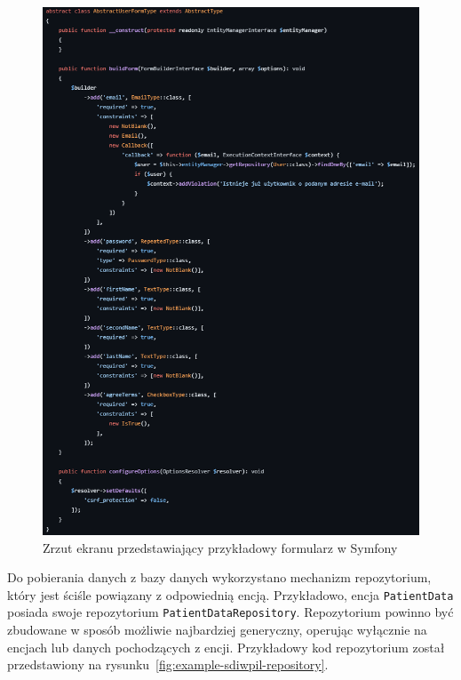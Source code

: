 \documentclass[12pt,oneside]{book}
\newcommand{\captionvspace}{\vspace{6pt}}
\begin{document}
    \begin{figure}[ht]
        \centering
        \includegraphics[width=\textwidth]{includes/images/example-form-before-migration.png}
        \captionvspace
        \caption{Zrzut ekranu przedstawiający przykładowy formularz w Symfony}
        \label{fig:example-sdiwpil-form}
    \end{figure}

    Do pobierania danych z bazy danych wykorzystano mechanizm repozytorium, który jest ściśle powiązany z odpowiednią encją. Przykładowo, encja \texttt{PatientData} posiada swoje repozytorium \texttt{PatientDataRepository}. Repozytorium powinno być zbudowane w sposób możliwie najbardziej generyczny, operując wyłącznie na encjach lub danych pochodzących z encji. Przykładowy kod repozytorium został przedstawiony na rysunku~\ref{fig:example-sdiwpil-repository}.
\end{document}
